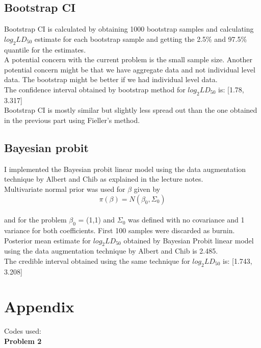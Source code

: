 \documentclass{article}
\begin{document}
\subsection{Bootstrap CI}
Bootstrap CI is calculated by obtaining 1000 bootstrap samples and calculating $log_2LD_{50}$ estimate for each bootstrap sample and getting the 2.5\% and 97.5\% quantile for the estimates.\\
A potential concern with the current problem is the small sample size. Another potential concern might be that we have aggregate data and not individual level data. The bootstrap might be better if we had individual level data.\\

The confidence interval obtained by bootstrap method for $log_2LD_{50}$ is: [1.78, 3.317]\\
Bootstrap CI is mostly similar but slightly less spread out than the one obtained in the previous part using Fieller's method.\\
\subsection{Bayesian probit}
I implemented the Bayesian probit linear model using the data augmentation technique by Albert and Chib as explained in the lecture notes.\\
Multivariate normal prior was used for $\beta$ given by\\
$$\pi(\beta)= N(\beta_0, \Sigma_0)$$\\
and for the problem $\beta_0$ = (1,1) and $\Sigma_0$ was defined with no covariance and 1 variance for both coefficients. First 100 samples were discarded as burnin.\\
Posterior mean estimate for $log_2LD_{50}$ obtained by Bayesian Probit linear model using the data augmentation technique by Albert and Chib is 2.485.\\
The credible interval obtained using the same technique for $log_2LD_{50}$ is: [1.743, 3.208]\\
\section{Appendix}
Codes used:\\
\textbf{Problem 2}\\

\begin{Schunk}
\end{Schunk}
\end{document}
